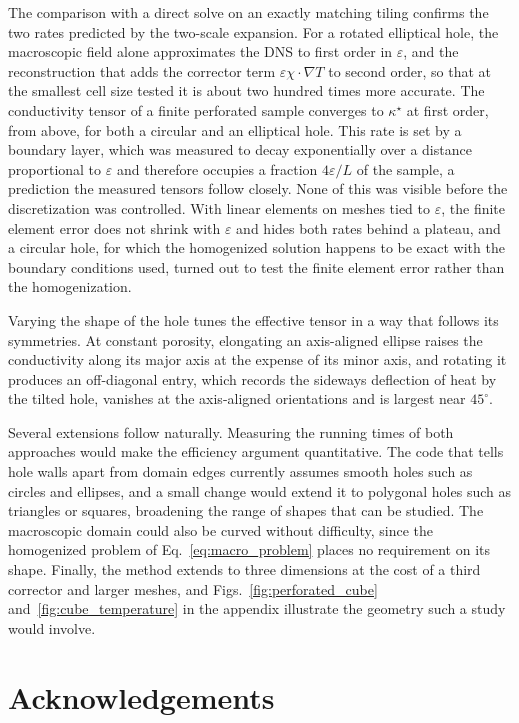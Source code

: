 \documentclass{article}
\begin{document}
The comparison with a direct solve on an exactly matching tiling confirms the two rates
predicted by the two-scale expansion. For a rotated elliptical hole, the macroscopic field
alone approximates the DNS to first order in $\varepsilon$, and the reconstruction that
adds the corrector term $\varepsilon \chi \cdot \nabla T$ to second order, so that at the
smallest cell size tested it is about two hundred times more accurate. The conductivity
tensor of a finite perforated sample converges to $\kappa^{\star}$ at first order, from
above, for both a circular and an elliptical hole. This rate is set by a boundary layer,
which was measured to decay exponentially over a distance proportional to $\varepsilon$
and therefore occupies a fraction $4\varepsilon/L$ of the sample, a prediction the
measured tensors follow closely. None of this was visible before the discretization was
controlled. With linear elements on meshes tied to $\varepsilon$, the finite element error
does not shrink with $\varepsilon$ and hides both rates behind a plateau, and a circular
hole, for which the homogenized solution happens to be exact with the boundary conditions
used, turned out to test the finite element error rather than the homogenization.

Varying the shape of the hole tunes the effective tensor in a way that follows its
symmetries. At constant porosity, elongating an axis-aligned ellipse raises the
conductivity along its major axis at the expense of its minor axis, and rotating it
produces an off-diagonal entry, which records the sideways deflection of heat by the
tilted hole, vanishes at the axis-aligned orientations and is largest near $45^{\circ}$.

Several extensions follow naturally. Measuring the running times of both approaches would
make the efficiency argument quantitative. The code that tells hole walls apart from
domain edges currently assumes smooth holes such as circles and ellipses, and a small
change would extend it to polygonal holes such as triangles or squares, broadening the
range of shapes that can be studied. The macroscopic domain could also be curved without
difficulty, since the homogenized problem of Eq.~\eqref{eq:macro_problem} places no
requirement on its shape. Finally, the method extends to three dimensions at the cost of a
third corrector and larger meshes, and Figs.~\ref{fig:perforated_cube}
and~\ref{fig:cube_temperature} in the appendix illustrate the geometry such a study would
involve.

\section*{Acknowledgements}
\end{document}
